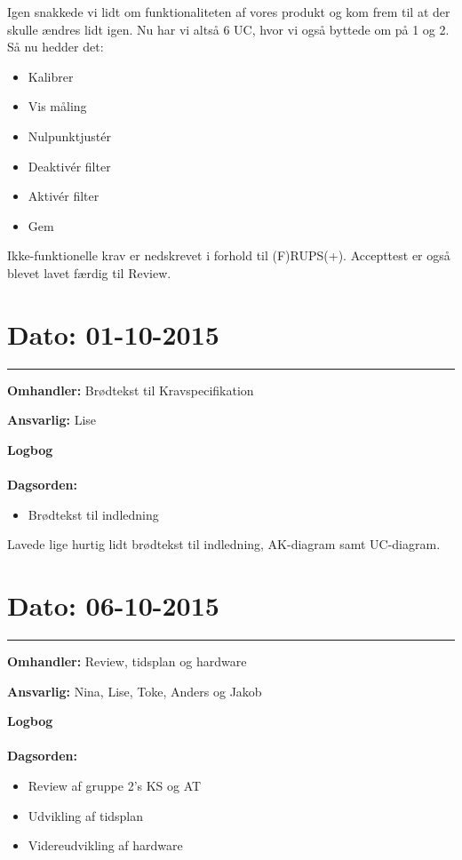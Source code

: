 Igen snakkede vi lidt om funktionaliteten af vores produkt og kom frem til at der skulle ændres lidt igen. Nu har vi altså 6 UC, hvor vi også byttede om på 1 og 2. Så nu hedder det: 
\begin{itemize}
	\item Kalibrer
	\item Vis måling 
	\item Nulpunktjustér 
	\item Deaktivér filter 
	\item Aktivér filter
	\item Gem 
\end{itemize}

Ikke-funktionelle krav er nedskrevet i forhold til (F)RUPS(+). Accepttest er også blevet lavet færdig til Review. 

	

\section{Dato: 01-10-2015 }
\hrule

\textbf{Omhandler:} Brødtekst til Kravspecifikation 

\textbf{Ansvarlig:} Lise 

\textbf{Logbog}
\\
\\
\textbf{Dagsorden:}
\begin{itemize}
	\item Brødtekst til indledning
\end{itemize}

Lavede lige hurtig lidt brødtekst til indledning, AK-diagram samt UC-diagram. 



\section{Dato: 06-10-2015 }
\hrule

\textbf{Omhandler:} Review, tidsplan og hardware  

\textbf{Ansvarlig:} Nina, Lise, Toke, Anders og Jakob

\textbf{Logbog}
\\
\\
\textbf{Dagsorden:}
\begin{itemize}
	\item Review af gruppe 2's KS og AT
	\item Udvikling af tidsplan
	\item Videreudvikling af hardware
\end{itemize}

